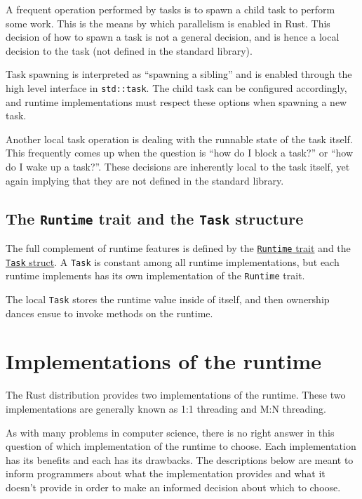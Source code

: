\documentclass[]{article}
\begin{document}
A frequent operation performed by tasks is to spawn a child task to
perform some work. This is the means by which parallelism is enabled in
Rust. This decision of how to spawn a task is not a general decision,
and is hence a local decision to the task (not defined in the standard
library).

Task spawning is interpreted as ``spawning a sibling'' and is enabled
through the high level interface in \texttt{std::task}. The child task
can be configured accordingly, and runtime implementations must respect
these options when spawning a new task.

Another local task operation is dealing with the runnable state of the
task itself. This frequently comes up when the question is ``how do I
block a task?'' or ``how do I wake up a task?''. These decisions are
inherently local to the task itself, yet again implying that they are
not defined in the standard library.

\subsection{The \texttt{Runtime} trait and the \texttt{Task}
structure}\label{the-runtime-trait-and-the-task-structure}

The full complement of runtime features is defined by the
\href{std/rt/trait.Runtime.html}{\texttt{Runtime} trait} and the
\href{std/rt/task/struct.Task.html}{\texttt{Task} struct}. A
\texttt{Task} is constant among all runtime implementations, but each
runtime implements has its own implementation of the \texttt{Runtime}
trait.

The local \texttt{Task} stores the runtime value inside of itself, and
then ownership dances ensue to invoke methods on the runtime.

\section{Implementations of the
runtime}\label{implementations-of-the-runtime}

The Rust distribution provides two implementations of the runtime. These
two implementations are generally known as 1:1 threading and M:N
threading.

As with many problems in computer science, there is no right answer in
this question of which implementation of the runtime to choose. Each
implementation has its benefits and each has its drawbacks. The
descriptions below are meant to inform programmers about what the
implementation provides and what it doesn't provide in order to make an
informed decision about which to choose.
\end{document}
